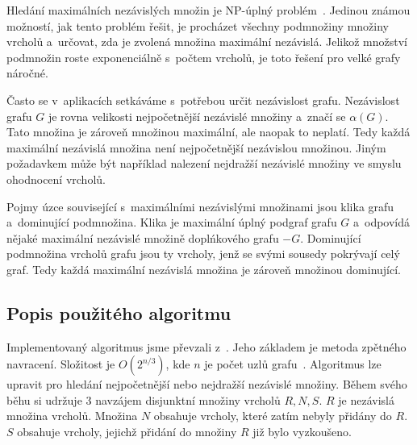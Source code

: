 \documentclass[12pt]{article}
\begin{document}
Hledání maximálních nezávislých množin je NP-úplný problém~\cite{tarjan}. Jedinou známou možností, jak tento problém řešit, je procházet všechny podmnožiny množiny vrcholů a~určovat, zda je zvolená množina maximální nezávislá. Jelikož množství podmnožin roste exponenciálně s~počtem vrcholů, je toto řešení pro velké grafy náročné.

Často se v~aplikacích  setkáváme s~potřebou určit nezávislost grafu. Nezávislost grafu \(G\) je rovna velikosti nejpočetnější nezávislé množiny a~značí se \(\alpha(G)\). Tato množina je zároveň množinou maximální, ale naopak to neplatí. Tedy každá maximální nezávislá množina není nejpočetnější nezávislou množinou. Jiným požadavkem může být například nalezení nejdražší nezávislé množiny ve smyslu ohodnocení vrcholů.

Pojmy úzce související s~maximálními nezávislými množinami jsou klika grafu a~dominující podmnožina. Klika je maximální úplný podgraf grafu \(G\) a~odpovídá nějaké maximální nezávislé množině doplńkového grafu \(-G\). Dominující podmnožina vrcholů grafu jsou ty vrcholy, jenž se svými sousedy pokrývají celý graf. Tedy každá maximální nezávislá množina je zároveň množinou dominující.

\subsection{Popis použitého algoritmu}
Implementovaný algoritmus jsme převzali z~\cite{demel}. Jeho základem je metoda zpětného navracení. Složitost je \(O(2^{n/3})\), kde \(n\) je počet uzlů grafu~\cite{tarjan}. Algoritmus lze upravit pro hledání nejpočetnější nebo nejdražší nezávislé množiny. Během svého běhu si udržuje 3 navzájem disjunktní množiny vrcholů \(R, N, S\). \(R\) je nezávislá množina vrcholů. Množina \(N\) obsahuje vrcholy, které zatím nebyly přidány do \(R\). \(S\) obsahuje vrcholy, jejichž přidání do množiny $R$ již bylo vyzkoušeno.
\end{document}
